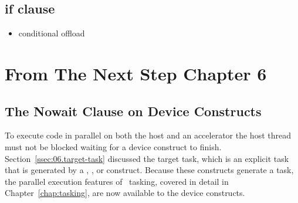 \subsection{if clause}
\label{sec:if_clause}
\begin{itemize}
  \item conditional offload
\end{itemize}

\section{From The Next Step Chapter 6}

\subsection{The Nowait Clause on Device Constructs}
\label{sec:06.async-exec}


To execute code in parallel on both the host and an
accelerator the host thread must not be blocked waiting for a
device construct to finish.  Section~\ref{ssec:06.target-task} discussed the
target task, which is an explicit task that is generated by a ,
,  or 
construct.  Because these constructs generate a task, the parallel execution
features of \OMP\ tasking, covered in detail in Chapter~\ref{chap:tasking}, are
now available to the device constructs.

